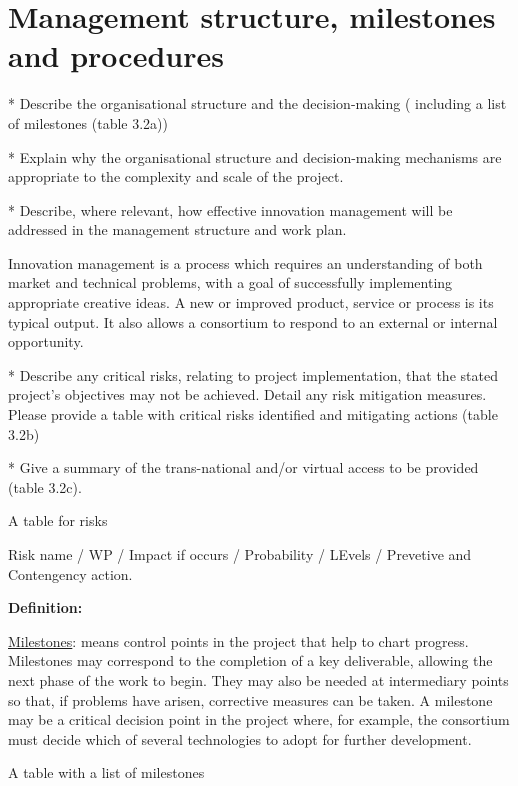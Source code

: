 \section{Management structure, milestones and procedures}

\begin{todo}{}\color{red}
  * Describe the organisational structure and the decision-making ( including a list of milestones (table 3.2a))

  * Explain why the organisational structure and decision-making mechanisms are appropriate to the complexity and scale of the project.

  * Describe, where relevant, how effective innovation management will be addressed in the management structure and work plan.

  Innovation management is a process which requires an understanding of both market and technical problems, with a goal of successfully implementing appropriate creative ideas. A new or improved product, service or process is its typical output. It also allows a consortium to respond to an external or internal opportunity.

  * Describe any critical risks, relating to project implementation, that the stated project's objectives may not be achieved. Detail any risk mitigation measures. Please provide a table with critical risks identified and mitigating actions (table 3.2b)

  * Give a summary of the trans-national and/or virtual access to be provided (table 3.2c).


  {\color{red} A table for risks}

    Risk name / WP / Impact if occurs / Probability / LEvels / Prevetive and
    Contengency action.

  {\bf Definition:}
  
  \underline{Milestones}: means control points in the project that help to chart progress. Milestones may correspond to the completion of a key deliverable, allowing the next phase of the work to begin. They may also be needed at intermediary points so that, if problems have arisen, corrective measures can be taken. A milestone may be a critical decision point in the project where, for example, the consortium must decide which of several technologies to adopt for further development.
\end{todo}

{\color{red} A table with a list of milestones}

